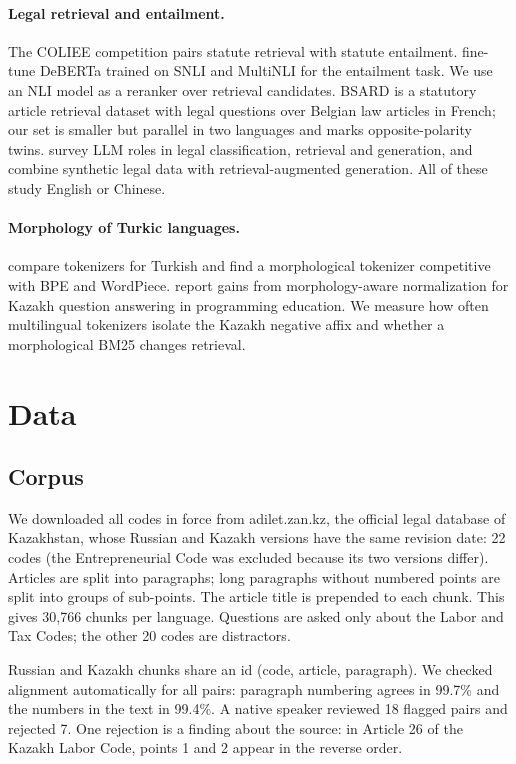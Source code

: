 \documentclass[11pt]{article}
\begin{document}
\paragraph{Legal retrieval and entailment.} The COLIEE competition pairs statute retrieval with statute
entailment. \citet{kim2024coliee} fine-tune DeBERTa trained on SNLI and MultiNLI for the entailment task.
We use an NLI model as a reranker over retrieval candidates. BSARD \citep{louis-spanakis-2022-statutory} is a
statutory article retrieval dataset with legal questions over Belgian law articles in French; our set is
smaller but parallel in two languages and marks opposite-polarity twins. \citet{chi2026legalai} survey LLM roles in legal
classification, retrieval and generation, and \citet{ren2026legal} combine synthetic legal data with
retrieval-augmented generation. All of these study English or Chinese.

\paragraph{Morphology of Turkic languages.} \citet{toraman2023tokenization} compare tokenizers for Turkish
and find a morphological tokenizer competitive with BPE and WordPiece. \citet{tukeyev2026kazakh} report gains
from morphology-aware normalization for Kazakh question answering in programming education. We measure how
often multilingual tokenizers isolate the Kazakh negative affix and whether a morphological BM25 changes
retrieval.

\section{Data}

\subsection{Corpus}
We downloaded all codes in force from adilet.zan.kz, the official legal database of Kazakhstan, whose Russian
and Kazakh versions have the same revision date: 22 codes (the Entrepreneurial Code was excluded because its
two versions differ). Articles are split into paragraphs; long paragraphs without numbered points are split
into groups of sub-points. The article title is prepended to each chunk. This gives 30,766 chunks per
language. Questions are asked only about the Labor and Tax Codes; the other 20 codes are distractors.

Russian and Kazakh chunks share an id (code, article, paragraph). We checked alignment automatically for all
pairs: paragraph numbering agrees in 99.7\% and the numbers in the text in 99.4\%. A native speaker reviewed
18 flagged pairs and rejected 7. One rejection is a finding about the source: in Article 26 of the Kazakh
Labor Code, points 1 and 2 appear in the reverse order.
\end{document}
